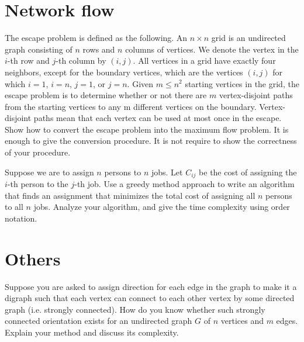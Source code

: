 \section{Network flow}
\begin{Exercise}
The escape problem is defined as the following. An $n \times n$ grid is an undirected graph consisting of $n$ rows and $n$ columns of vertices. We denote the vertex in the $i$-th row and $j$-th column by $(i, j)$. All vertices in a grid have exactly four neighbors, except for the boundary vertices, which are the vertices $(i, j)$ for which $i = 1$, $i = n$, $j = 1$, or $j = n$. Given $m \leq n^2$ starting vertices in the grid, the escape problem is to determine whether or not there are $m$ vertex-disjoint paths from the starting vertices to any m different vertices on the boundary. Vertex-disjoint paths mean that each vertex can be used at most once in the escape. Show how to convert the escape problem into the maximum flow problem. It is enough to give the conversion procedure. It is not require to show the correctness of your procedure. 
\end{Exercise}
\begin{Answer}
\end{Answer}

\begin{Exercise}
Suppose we are to assign $n$ persons to $n$ jobs. Let $C_{ij}$ be the cost of assigning the $i$-th person to the $j$-th job. Use a greedy method approach to write an algorithm that finds an assignment that minimizes the total cost of assigning all $n$ persons to all $n$ jobs. Analyze your algorithm, and give the time complexity using order notation. 
\end{Exercise}
\begin{Answer}
\end{Answer}

\section{Others}
\begin{Exercise}
Suppose you are asked to assign direction for each edge in the graph to make it a digraph such that each vertex can connect to each other vertex by some directed graph (i.e. strongly connected). How do you know whether such strongly connected orientation exists for an undirected graph $G$ of $n$ vertices and $m$ edges. Explain your method and discuss its complexity. \school{[NCKU IM 99]}
\end{Exercise}
\begin{Answer}
\end{Answer}

